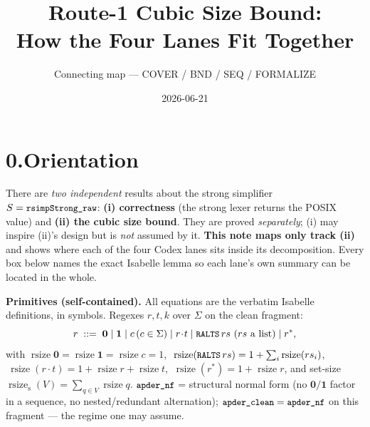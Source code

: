 \documentclass[11pt]{article}
\title{Route-1 Cubic Size Bound:\\How the Four Lanes Fit Together}
\author{Connecting map — COVER / BND / SEQ / FORMALIZE}
\date{2026-06-21}
\newcommand{\rsz}{\operatorname{rsize}}
\newcommand{\Sstrong}{S}
\newcommand{\one}{\mathbf{1}}
\newcommand{\zero}{\mathbf{0}}
\newcommand{\code}[1]{\texttt{\small #1}}
\begin{document}
\maketitle

\section*{0.\quad Orientation}
There are \emph{two independent} results about the strong simplifier $\Sstrong=\code{rsimpStrong\_raw}$:
\textbf{(i) correctness} (the strong lexer returns the POSIX value) and
\textbf{(ii) the cubic size bound}. They are proved \emph{separately}; (i) may inspire (ii)'s design but is
\emph{not} assumed by it. \textbf{This note maps only track (ii)} and shows where each of the four Codex
lanes sits inside its decomposition. Every box below names the exact Isabelle lemma so each lane's own
summary can be located in the whole.

\medskip
\textbf{Primitives (self-contained).} All equations are the verbatim Isabelle definitions, in symbols.
Regexes $r,t,k$ over $\Sigma$ on the clean fragment:
\[
r\;::=\;\zero\mid\one\mid c\,(c\in\Sigma)\mid r\!\cdot\! t\mid \code{RALTS}\,rs\ (rs\text{ a list})\mid r^{*},
\]
with $\rsz\zero=\rsz\one=\rsz c=1$, $\ \rsz(\code{RALTS}\,rs)=1+\sum_i\rsz(rs_i)$, $\ \rsz(r\!\cdot\! t)=1+\rsz r+\rsz t$,
$\ \rsz(r^{*})=1+\rsz r$, and set-size $\rsz_{\mathrm s}(V)=\sum_{q\in V}\rsz q$. $\code{apder\_nf}$ = structural
normal form (no $\zero/\one$ factor in a sequence, no nested/redundant alternation); $\code{apder\_clean}=
\code{apder\_nf}$ on this fragment — the regime one may assume.
\end{document}
